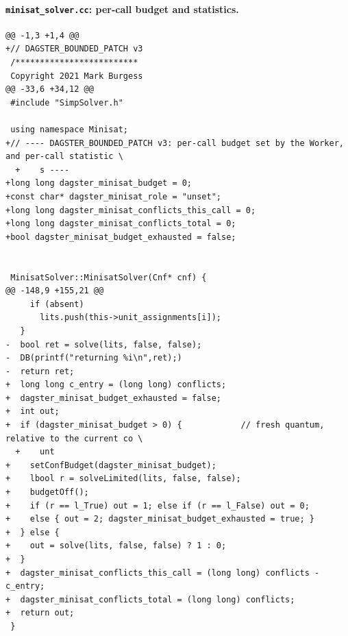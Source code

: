 \documentclass[11pt,a4paper]{article}
\begin{document}
\paragraph{\texttt{minisat\_solver.cc}: per-call budget and statistics.}
{\scriptsize\begin{verbatim}
@@ -1,3 +1,4 @@
+// DAGSTER_BOUNDED_PATCH v3
 /*************************
 Copyright 2021 Mark Burgess
@@ -33,6 +34,12 @@
 #include "SimpSolver.h"
 
 using namespace Minisat;
+// ---- DAGSTER_BOUNDED_PATCH v3: per-call budget set by the Worker, and per-call statistic \
  +    s ----
+long long dagster_minisat_budget = 0;
+const char* dagster_minisat_role = "unset";
+long long dagster_minisat_conflicts_this_call = 0;
+long long dagster_minisat_conflicts_total = 0;
+bool dagster_minisat_budget_exhausted = false;
 
 
 MinisatSolver::MinisatSolver(Cnf* cnf) {
@@ -148,9 +155,21 @@
     if (absent)
       lits.push(this->unit_assignments[i]);
   }
-  bool ret = solve(lits, false, false);
-  DB(printf("returning %i\n",ret);)
-  return ret;
+  long long c_entry = (long long) conflicts;
+  dagster_minisat_budget_exhausted = false;
+  int out;
+  if (dagster_minisat_budget > 0) {            // fresh quantum, relative to the current co \
  +    unt
+    setConfBudget(dagster_minisat_budget);
+    lbool r = solveLimited(lits, false, false);
+    budgetOff();
+    if (r == l_True) out = 1; else if (r == l_False) out = 0;
+    else { out = 2; dagster_minisat_budget_exhausted = true; }
+  } else {
+    out = solve(lits, false, false) ? 1 : 0;
+  }
+  dagster_minisat_conflicts_this_call = (long long) conflicts - c_entry;
+  dagster_minisat_conflicts_total = (long long) conflicts;
+  return out;
 }
\end{verbatim}}



\end{document}
